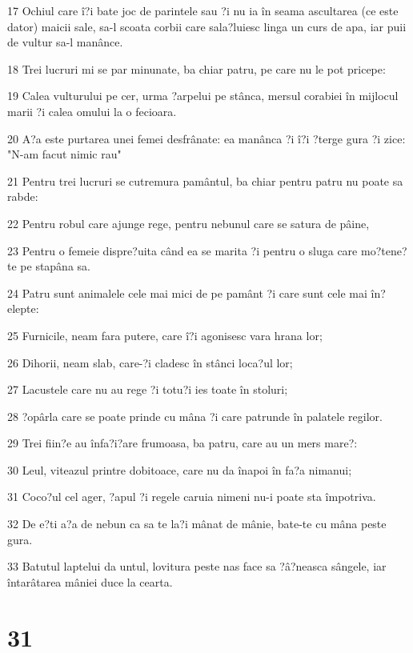 \par 17 Ochiul care î?i bate joc de parintele sau ?i nu ia în seama ascultarea (ce este dator) maicii sale, sa-l scoata corbii care sala?luiesc linga un curs de apa, iar puii de vultur sa-l manânce.
\par 18 Trei lucruri mi se par minunate, ba chiar patru, pe care nu le pot pricepe:
\par 19 Calea vulturului pe cer, urma ?arpelui pe stânca, mersul corabiei în mijlocul marii ?i calea omului la o fecioara.
\par 20 A?a este purtarea unei femei desfrânate: ea manânca ?i î?i ?terge gura ?i zice: "N-am facut nimic rau"
\par 21 Pentru trei lucruri se cutremura pamântul, ba chiar pentru patru nu poate sa rabde:
\par 22 Pentru robul care ajunge rege, pentru nebunul care se satura de pâine,
\par 23 Pentru o femeie dispre?uita când ea se marita ?i pentru o sluga care mo?tene?te pe stapâna sa.
\par 24 Patru sunt animalele cele mai mici de pe pamânt ?i care sunt cele mai în?elepte:
\par 25 Furnicile, neam fara putere, care î?i agonisesc vara hrana lor;
\par 26 Dihorii, neam slab, care-?i cladesc în stânci loca?ul lor;
\par 27 Lacustele care nu au rege ?i totu?i ies toate în stoluri;
\par 28 ?opârla care se poate prinde cu mâna ?i care patrunde în palatele regilor.
\par 29 Trei fiin?e au înfa?i?are frumoasa, ba patru, care au un mers mare?:
\par 30 Leul, viteazul printre dobitoace, care nu da înapoi în fa?a nimanui;
\par 31 Coco?ul cel ager, ?apul ?i regele caruia nimeni nu-i poate sta împotriva.
\par 32 De e?ti a?a de nebun ca sa te la?i mânat de mânie, bate-te cu mâna peste gura.
\par 33 Batutul laptelui da untul, lovitura peste nas face sa ?â?neasca sângele, iar întarâtarea mâniei duce la cearta.

\chapter{31}

